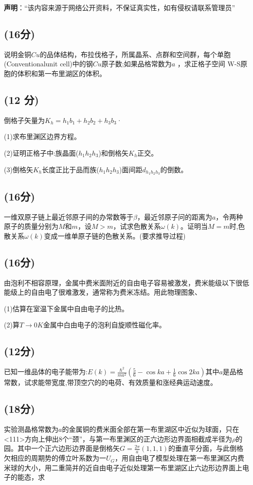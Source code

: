 
\textbf{声明}：“该内容来源于网络公开资料，不保证真实性，如有侵权请联系管理员”

\subsection{(16分)}
说明金铜$Cu$的品体结构，布拉伐格子，所属晶系、点群和空间群，每个单胞(Conventionalunit cell)中的钢$Cu$原子数;如果品格常数为$a$ ，求正格子空间 W-S原胞的体积和第一布里湖区的体积。
\subsection{(12 分)}
倒格子矢量为$K_h=h_1b_1+h_2b_2+h_3b_3$·

(1)求布里渊区边界方程。

(2)证明正格子中:族晶面($h_1h_2h_3$)和倒格矢$K_h$正交。

(3)倒格矢$K_h$长度正比于品而族($h_1h_2h_3$)面间距$d_{h_1h_2h_3}$的倒数。
\subsection{(16分)}
一维双原子链上最近邻原子间的办常数等于$\beta$，最近邻原子问的距离为$a$，令两种原子的质量分别为$M$和$m$，设$M>m$，试求色散关系$\omega(k)$。证明当$M=m$时,色散关系$\omega(k)$变成一维单原子链的色散关系。(要求推导过程)
\subsection{(16分)}
由泡利不相容原理，金属中费米面附近的自由电子容易被激发，费米能级以下很低能级上的自由电了很难激发，通常称为费米冻结。用此物理图象、

(1)估算在室温下金属中自由电子的比热。

(2)算$T\to0K$金属中白由电子的泡利自旋顺性磁化率。
\subsection{(12分)}
已知一维品体的电子能带为:$E(k) = \frac{\hbar^2}{ma^2} \left( \frac{5}{6} - \cos ka + \frac{1}{6} \cos 2ka \right)$其中$a$是品格常数，试求能带宽度,带顶空穴的的电荷、有效质量和涨经典运动速度。
\subsection{(18分)}
实验测晶格常数为$a$的金属铜的费米面全部在第一布里湖区中近似为球面，只在<111>方向上伸出8个“颈”，与第一布里渊区的正六边形边界面相截成半径为$\rho $的园。其中一个正六边形边界面是倒格矢$G=\frac{2\pi}{a}(1,1,1)$的垂直平分面，与此倒格欠相应的周期势的傅立叶系数为一$U_G$，用自由电了模型处理在第一布里渊区内费米球的大小，用二重简并的近自由电子近似处理第一布里湖区止六边形边界面上电子的能态，求


